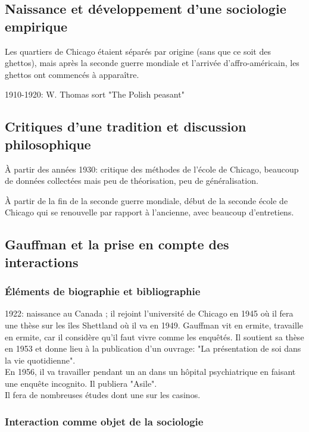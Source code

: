 \documentclass[10pt, a4paper, openany]{book}
\begin{document}
\subsection{Naissance et développement d'une sociologie empirique}

Les quartiers de Chicago étaient séparés par origine (sans que ce soit des ghettos), mais après la seconde guerre mondiale et l'arrivée d'affro-américain, les ghettos ont commencés à apparaître.

1910-1920: W. Thomas sort "The Polish peasant"


\subsection{Critiques d'une tradition et discussion philosophique}

À partir des années 1930: critique des méthodes de l'école de Chicago, beaucoup de données collectées mais peu de théorisation, peu de généralisation. 

À partir de la fin de la seconde guerre mondiale, début de la seconde école de Chicago qui se renouvelle par rapport à l'ancienne, avec beaucoup d'entretiens. 


\subsection{Gauffman et la prise en compte des interactions}

\subsubsection{Éléments de biographie et bibliographie}
1922: naissance au Canada ; il rejoint l'université de Chicago en 1945 où il fera une thèse sur les îles Shettland où il va en 1949. Gauffman vit en ermite, travaille en ermite, car il considère qu'il faut vivre comme les enquêtés. Il soutient sa thèse en 1953 et donne lieu à la publication d'un ouvrage: "La présentation de soi dans la vie quotidienne". \\
En 1956, il va travailler pendant un an dans un hôpital psychiatrique en faisant une enquête incognito. Il publiera "Asile". \\
Il fera de nombreuses études dont une sur les casinos.

\subsubsection{Interaction comme objet de la sociologie}
\end{document}
